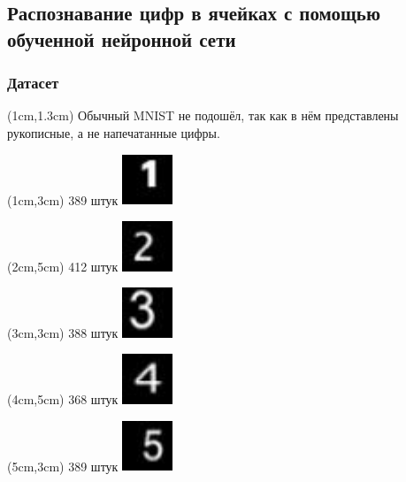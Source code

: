 \documentclass{beamer}
\begin{document}
\subsection{Распознавание цифр в ячейках с помощью обученной нейронной сети}

\begin{frame}
\frametitle{Датасет}
\begin{textblock*}{10cm}(1cm,1.3cm)
Обычный MNIST не подошёл, так как в нём представлены рукописные, а не напечатанные цифры.
\end{textblock*}

\begin{textblock*}{1.5cm}(1cm,3cm)
\tiny 389 штук
\includegraphics[width=1.5cm]{1_00112}
\end{textblock*}

\begin{textblock*}{1.5cm}(2cm,5cm)
\tiny 412 штук
\includegraphics[width=1.5cm]{2_00163}
\end{textblock*}

\begin{textblock*}{1.5cm}(3cm,3cm)
\tiny 388 штук
\includegraphics[width=1.5cm]{3_00108}
\end{textblock*}

\begin{textblock*}{1.5cm}(4cm,5cm)
\tiny 368 штук
\includegraphics[width=1.5cm]{4_00114}
\end{textblock*}

\begin{textblock*}{1.5cm}(5cm,3cm)
\tiny 389 штук
\includegraphics[width=1.5cm]{5_00063}
\end{textblock*}


\end{frame}
\end{document}
